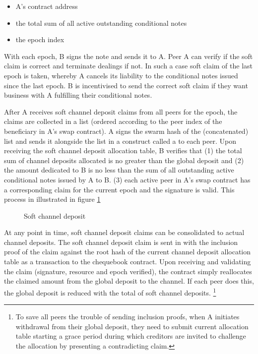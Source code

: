 \begin{itemize}
  \item A's contract address
  \item the total sum of all active outstanding conditional notes
  \item the epoch index
\end{itemize}

With each epoch, B signs the note and sends it to A.
Peer A can verify if the soft claim is correct and terminate dealings if not. In such a case soft claim of
the last epoch is taken, whereby A cancels its liability to the conditional notes issued since
the last epoch.
B is incentivised to send the correct soft claim if they want business with A fulfilling their
conditional notes.

After A receives soft channel deposit claims from all peers for the epoch, the claims are
collected in a list (ordered according to the peer index of the beneficiary in A's swap contract).
A signs the swarm hash of the (concatenated) list and sends it alongside the list
in a construct called a  to each peer.
Upon receiving the soft channel deposit allocation table, B verifies that
(1) the total sum of channel deposits allocated is no greater than the global deposit and
(2) the amount dedicated to B is no less than the sum of all outstanding active
conditional notes issued by A to B.
(3) each active peer in A's swap contract has a corresponding claim for the current epoch and the signature is valid.
This process in illustrated in figure \ref{fig:softchanneldeposit}


\begin{center}
\begin{figure}
\begin{center}
\begin{tikzpicture}
\end{tikzpicture}
\end{center}
\caption{Soft channel deposit}
\label{fig:softchanneldeposit}
\end{figure}
\end{center}




At any point in time, soft channel deposit claims can be consolidated to actual
channel deposits.
The soft channel deposit claim is sent in with the inclusion proof of the claim against the root hash of the
current channel deposit allocation table as a transaction to the
chequebook contract. Upon receiving and validating the claim (signature, resource and epoch verified),
the contract simply reallocates the claimed amount from the global deposit to the channel.
If each peer does this, the global deposit is reduced with the total of soft channel
deposits.%
%
\footnote{To save all peers the trouble of sending inclusion proofs, when A initiates withdrawal from
their global deposit, they need to submit current allocation table starting a grace period during which
creditors are invited to challenge the allocation by presenting a contradicting claim.}

